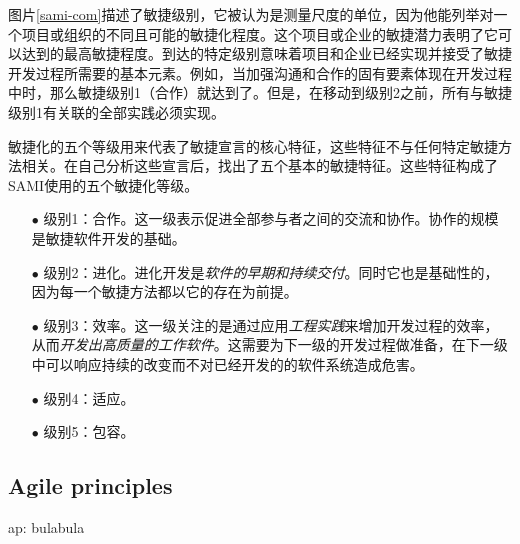 \documentclass[twocolumn]{svjour3}[]
\begin{document}
图片\ref{sami-com}描述了敏捷级别，它被认为是测量尺度的单位，因为他能列举对一个项目或组织的不同且可能的敏捷化程度。这个项目或企业的敏捷潜力表明了它可以达到的最高敏捷程度。到达的特定级别意味着项目和企业已经实现并接受了敏捷开发过程所需要的基本元素。例如，当加强沟通和合作的固有要素体现在开发过程中时，那么敏捷级别1（合作）就达到了。但是，在移动到级别2之前，所有与敏捷级别1有关联的全部实践必须实现。

敏捷化的五个等级用来代表了敏捷宣言的核心特征\cite{agilemanifestoo2001agile}，这些特征不与任何特定敏捷方法相关。在自己分析这些宣言后，找出了五个基本的敏捷特征。这些特征构成了SAMI使用的五个敏捷化等级。

\begin{itemize}
    \item[$\bullet$] 级别1：合作。这一级表示促进全部参与者之间的交流和协作。协作的规模是敏捷软件开发的基础\cite{cockburn2001agile,cockburn2001agilesoftware,tabaka2006collaboration}。
    \item[$\bullet$] 级别2：进化。进化开发是\textit{软件的早期和持续交付}。同时它也是基础性的，因为每一个敏捷方法都以它的存在为前提\cite{larman2004agile}。
    \item[$\bullet$] 级别3：效率。这一级关注的是通过应用\textit{工程实践}来增加开发过程的效率，从而\textit{开发出高质量的工作软件}。这需要为下一级的开发过程做准备，在下一级中可以响应持续的改变而不对已经开发的的软件系统造成危害\cite{cockburn2001agilesoftware,hunt2006agile}。
    \item[$\bullet$] 级别4：适应。
    \item[$\bullet$] 级别5：包容。
\end{itemize}

\subsection{Agile principles}
\label{ap}

ap: bulabula



\end{document}
